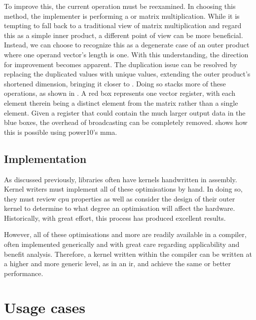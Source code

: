 \documentclass[\main/thesis.tex]{subfiles}
\begin{document}
To improve this, the current operation must be reexamined.
In choosing this method, the implementer is performing a  or  matrix multiplication.
While it is tempting to fall back to a traditional view of matrix multiplication and regard this as a simple inner product, a different point of view can be more beneficial.
Instead, we can choose to recognize this as a degenerate case of an outer product where one operand vector's length is one.
With this understanding, the direction for improvement becomes apparent.
The duplication issue can be resolved by replacing the duplicated values with unique values, extending the outer product's shortened dimension, bringing it closer to .
Doing so stacks more of these operations, as shown in .
A red box represents one vector register, with each element therein being a distinct element from the matrix rather than a single  element.
Given a register that could contain the much larger output data in the blue boxes, the overhead of broadcasting can be completely removed.
 shows how this is possible using \gls{power10}'s \gls{mma}.

\subsection{Implementation}
As discussed previously, libraries often have kernels handwritten in assembly.
Kernel writers must implement all of these optimisations by hand.
In doing so, they must review \gls{cpu} properties as well as consider the design of their outer kernel to determine to what degree an optimisation will affect the hardware.
Historically, with great effort, this process has produced excellent results.

However, all of these optimisations and more are readily available in a compiler, often implemented generically and with great care regarding applicability and benefit analysis.
Therefore, a kernel written within the compiler can be written at a higher and more generic level, as in an \gls{ir}, and achieve the same or better performance.

\section{Usage cases}
\end{document}
